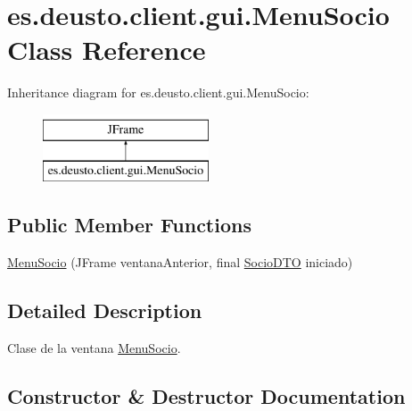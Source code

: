 \hypertarget{classes_1_1deusto_1_1client_1_1gui_1_1_menu_socio}{}\section{es.\+deusto.\+client.\+gui.\+Menu\+Socio Class Reference}
\label{classes_1_1deusto_1_1client_1_1gui_1_1_menu_socio}
Inheritance diagram for es.\+deusto.\+client.\+gui.\+Menu\+Socio\+:\begin{figure}[H]
\begin{center}
\leavevmode
\includegraphics[height=2.000000cm]{classes_1_1deusto_1_1client_1_1gui_1_1_menu_socio}
\end{center}
\end{figure}
\subsection*{Public Member Functions}
\begin{DoxyCompactItemize}
\item 
\mbox{\hyperlink{classes_1_1deusto_1_1client_1_1gui_1_1_menu_socio_acd94b249c6dbe60065acf8607fe0467a}{Menu\+Socio}} (J\+Frame ventana\+Anterior, final \mbox{\hyperlink{classes_1_1deusto_1_1server_1_1dto_1_1_socio_d_t_o}{Socio\+D\+TO}} iniciado)
\end{DoxyCompactItemize}


\subsection{Detailed Description}
Clase de la ventana \mbox{\hyperlink{classes_1_1deusto_1_1client_1_1gui_1_1_menu_socio}{Menu\+Socio}}. 

\subsection{Constructor \& Destructor Documentation}
\mbox{\label{classes_1_1deusto_1_1client_1_1gui_1_1_menu_socio_acd94b249c6dbe60065acf8607fe0467a}} 
